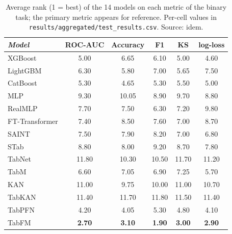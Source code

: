 \begin{table}[htbp]
\centering
\small
\caption[Secondary metrics --- binary task]{Average rank (1 = best) of the 14 models on each metric of the binary task; the primary metric appears for reference. Per-cell values in \texttt{results/\allowbreak aggregated/\allowbreak test\_\allowbreak results.\allowbreak csv}. Source: idem.}
\label{tab:app-secundarias-binary}
\begin{tabular}{lccccc}
\toprule
\emph{Model} & ROC-AUC & Accuracy & F1 & KS & log-loss \\
\midrule
XGBoost & 5.00 & 6.65 & 6.10 & 5.00 & 4.60 \\
LightGBM & 6.30 & 5.80 & 7.00 & 5.65 & 7.50 \\
CatBoost & 5.30 & 4.65 & 5.30 & 5.50 & 5.00 \\
MLP & 9.30 & 10.05 & 8.90 & 9.70 & 8.80 \\
RealMLP & 7.70 & 7.50 & 6.30 & 7.20 & 9.80 \\
FT-Transformer & 7.40 & 8.50 & 7.60 & 7.00 & 8.70 \\
SAINT & 7.50 & 7.90 & 8.20 & 7.00 & 6.80 \\
STab & 8.80 & 8.00 & 9.20 & 8.70 & 7.80 \\
TabNet & 11.80 & 10.30 & 10.50 & 11.70 & 11.20 \\
TabM & 6.60 & 7.05 & 6.90 & 7.25 & 5.70 \\
KAN & 11.00 & 9.75 & 10.00 & 11.00 & 10.70 \\
TabKAN & 11.40 & 11.70 & 11.80 & 11.50 & 11.40 \\
TabPFN & 4.20 & 4.05 & 5.30 & 4.80 & 4.10 \\
TabFM & \textbf{2.70} & \textbf{3.10} & \textbf{1.90} & \textbf{3.00} & \textbf{2.90} \\
\bottomrule
\end{tabular}
\end{table}

